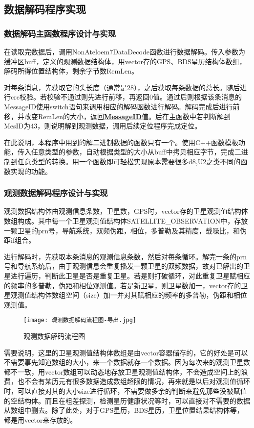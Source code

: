 \documentclass{ctexart}
\begin{document}
\subsection{数据解码程序实现}
\subsubsection{数据解码主函数程序设计与实现}
在读取完数据后，调用NonAteloem7DataDecode函数进行数据解码。传入参数为缓冲区buff，定义的观测数据结构体，用vector存的GPS、BDS星历结构体数组，解码所得位置结构体，剩余字节数RemLen。

对每条消息，先获取它的头长度（通常是28），之后获取每条数据的总长。随后进行crc校验。若校验不通过则先进行前移，再返回0值。通过后则根据该条消息的MessageID使用switch语句来调用相应的解码函数进行解码。解码完成后进行前移，并改变RemLen的大小，返回\underline{\textbf{MessageID}}值。后在主函数中若判断解到MesID为43，则说明解到观测数据，调用后续定位程序完成定位。

在此说明，本程序中用到的解二进制数据的函数只有一个。使用C++函数模板功能，传入任意类型的参数，自动根据类型的大小从buff中拷贝相应字节，完成二进制到任意类型的转换。用一个函数即可轻松实现原本需要很多d8,U2之类不同的函数实现的功能。
\subsubsection{观测数据解码程序设计与实现}
观测数据结构体由观测信息条数，卫星数，GPS时，vector存的卫星观测值结构体数组构成。其中每一个卫星观测值结构体SATELLITE\_OBSERVATION中，存放一颗卫星的prn号，导航系统，双频伪距，相位，多普勒及其精度，载噪比，和伪距if组合。

进行解码时，先获取本条消息的观测信息条数，然后对每条循环。解完一条的prn号和导航系统后，由于观测信息会重复播发一颗卫星的双频数据，故对已解出的卫星进行遍历，判断此卫星是否是重复卫星。若是则打破循环，对此重复卫星赋相应的频率的多普勒，伪距和相位观测值。若是新卫星，则卫星数加一，vector存的卫星观测值结构体数组空间（size）加一并对其赋相应的频率的多普勒，伪距和相位观测值。
\begin{figure}[H]
\texttt{[image: 观测数据解码流程图-导出.jpg]}
\caption{观测数据解码流程图}
\end{figure}

需要说明，这里的卫星观测值结构体数组是由vector容器储存的，它的好处是可以不需要事先知道数组的大小，来一个数据就存一个数据。因为每次来的观测卫星数都不一致，用vector数组可以动态地存放卫星观测值结构体，不会造成空间上的浪费，也不会有某历元有很多数据造成数组超限的情况，再来就是以后对观测值循环时，可以直接对其的大小size进行循环，不需要做多余的判断来避免那些没被赋值的空结构体。而且在粗差探测，检测星历健康状况等时，可以直接对不需要的数据从数组中删去。除了此处，对于GPS星历，BDS星历，卫星位置结果结构体等，都是用vector来存放的。
\end{document}

